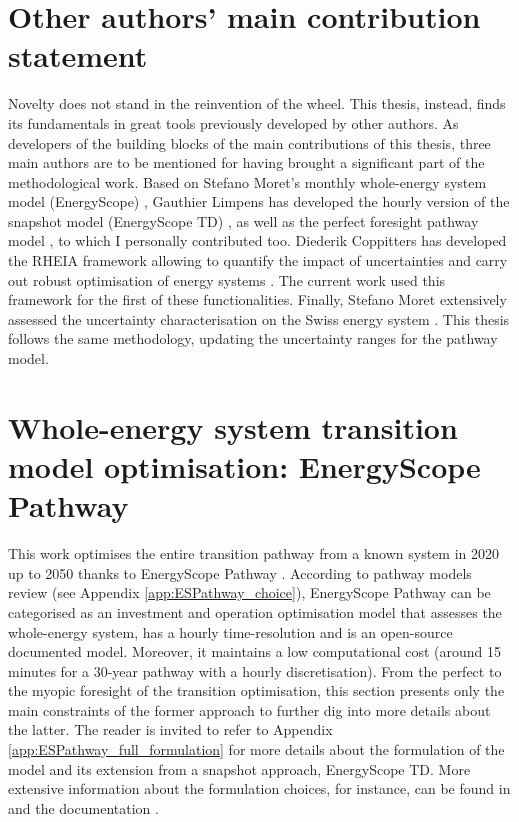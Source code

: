 \section*{Other authors' main contribution statement}
Novelty does not stand in the reinvention of the wheel.  This thesis, instead, finds its fundamentals in great tools previously developed by other authors. As developers of the building blocks of the main contributions of this thesis, three main authors are to be mentioned for having brought a significant part of the methodological work. Based on Stefano Moret's monthly whole-energy system model (\ie EnergyScope) \cite{moret2016strategic}, Gauthier Limpens has developed the hourly version of the snapshot model (\ie EnergyScope TD) \cite{limpens2019energyscope}, as well as the perfect foresight pathway model \cite{limpens2024pathway}, to which I personally contributed too. Diederik Coppitters has developed the RHEIA framework allowing to quantify the impact of uncertainties and carry out robust optimisation of energy systems \cite{coppittersthesis}. The current work used this framework for the first of these functionalities. Finally, Stefano Moret extensively assessed the uncertainty characterisation on the Swiss energy system \cite{Moret2017}. This thesis follows the same methodology, updating the uncertainty ranges for the pathway model.

\section{Whole-energy system transition model optimisation: EnergyScope Pathway}
\label{sec:meth:ES}

This work optimises the entire transition pathway from a known system in 2020 up to 2050 thanks to EnergyScope Pathway \cite{limpens2024pathway}. According to pathway models review (see Appendix \ref{app:ESPathway_choice}), EnergyScope Pathway can be categorised as an investment and operation optimisation model that assesses the whole-energy system, has a hourly time-resolution and is an open-source documented model. Moreover, it maintains a low computational cost (\ie around 15 minutes for a 30-year pathway with a hourly discretisation). From the perfect to the myopic foresight of the transition optimisation, this section presents only the main constraints of the former approach to further dig into more details about the latter. The reader is invited to refer to Appendix \ref{app:ESPathway_full_formulation} for more details about the formulation of the model and its extension from a snapshot approach, EnergyScope TD. More extensive information about the formulation choices, for instance, can be found in \cite{limpens2024pathway} and the documentation \cite{readthedocs_pathway}.

